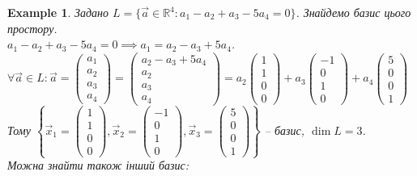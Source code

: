 \documentclass[a4paper, 10pt]{article}
\theoremstyle{theoremdd}
\newtheorem{example}[theorem]{Example}
\begin{document}
	\begin{example}
	Задано $L = \{\vec{a} \in \mathbb{R}^4: a_1 - a_2 + a_3 - 5a_4 = 0\}$. Знайдемо базис цього простору.\\
	$a_1 - a_2 + a_3 - 5a_4 = 0 \implies a_1 = a_2 - a_3 + 5a_4$.\\
	$\forall \vec{a} \in L: \vec{a} = \begin{pmatrix} a_1 \\ a_2 \\ a_3 \\ a_4 \end{pmatrix} = \begin{pmatrix} a_2 - a_3 + 5a_4 \\ a_2 \\ a_3 \\ a_4 \end{pmatrix} = a_2 \begin{pmatrix} 1 \\ 1 \\ 0 \\ 0\end{pmatrix} + a_3 \begin{pmatrix} -1 \\ 0 \\ 1 \\ 0\end{pmatrix} + a_4 \begin{pmatrix} 5 \\ 0 \\ 0 \\ 1 \end{pmatrix}$\\
	Тому $\left\{\vec{x}_1 = \begin{pmatrix} 1 \\ 1 \\ 0 \\ 0\end{pmatrix}, \vec{x}_2 = \begin{pmatrix} -1 \\ 0 \\ 1 \\ 0\end{pmatrix}, \vec{x}_3 = \begin{pmatrix} 5 \\ 0 \\ 0 \\ 1\end{pmatrix} \right\}$ -- базис, $\dim{L} = 3$.
	\bigskip \\
	Можна знайти також інший базис:\\

\end{example}
\end{document}
